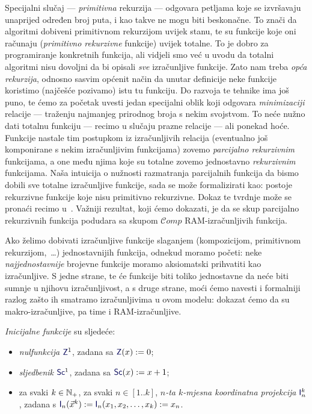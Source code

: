 Specijalni slučaj --- \emph{primitivna} rekurzija --- odgovara petljama koje se izvršavaju unaprijed određen broj puta, i kao takve ne mogu biti beskonačne. To znači da algoritmi dobiveni primitivnom rekurzijom uvijek stanu, te su funkcije koje oni računaju (\emph{primitivno rekurzivne} funkcije) uvijek totalne. To je dobro za programiranje konkretnih funkcija, ali vidjeli smo već u uvodu da totalni algoritmi nisu dovoljni da bi opisali \emph{sve} izračunljive funkcije. Zato nam treba \emph{opća rekurzija}, odnosno sasvim općenit način da unutar definicije neke funkcije koristimo (najčešće pozivamo) istu tu funkciju. Do razvoja te tehnike ima još puno, te ćemo za početak uvesti jedan specijalni oblik koji odgovara \emph{minimizaciji} relacije --- traženju najmanjeg prirodnog broja s nekim svojstvom. To neće nužno dati totalnu funkciju --- recimo u slučaju prazne relacije --- ali ponekad hoće. Funkcije nastale tim postupkom iz izračunljivih relacija (eventualno još komponirane s nekim izračunljivim funkcijama) zovemo \emph{parcijalno rekurzivnim} funkcijama, a one među njima koje su totalne zovemo jednostavno \emph{rekurzivnim} funkcijama. Naša intuicija o nužnosti razmatranja parcijalnih funkcija da bismo dobili sve totalne izračunljive funkcije, sada se može formalizirati kao: postoje rekurzivne funkcije koje nisu primitivno rekurzivne. Dokaz te tvrdnje može se pronaći recimo u~\cite[dodatak]{skr:Vuk}. Važniji rezultat, koji ćemo dokazati, je da se skup parcijalno rekurzivnih funkcija podudara sa skupom $\mathcal Comp$ RAM-izračunljivih funkcija. %


Ako želimo dobivati izračunljive funkcije slaganjem (kompozicijom, primitivnom rekurzijom,~\ldots) jednostavnijih funkcija, odnekud moramo početi: neke \emph{najjednostavnije} brojevne funkcije moramo aksiomatski prihvatiti kao izračunljive. S jedne strane, te će funkcije biti toliko jednostavne da neće biti sumnje u njihovu izračunljivost, a s druge strane, moći ćemo navesti i formalniji razlog zašto ih smatramo izračunljivima u ovom modelu: dokazat ćemo da su makro-izračunljive, pa time i RAM-izračunljive.

\begin{definicija}[{name=[inicijalne funkcije]}]\label{def:init}
\emph{Inicijalne funkcije} su sljedeće:
\begin{itemize}
    \item \emph{nulfunkcija} $\f Z^1$, zadana sa $\f Z(x):=0$;
    \item \emph{sljedbenik} $\f{Sc}^1$, zadana sa $\f{Sc}(x):=x+1$;
    \item za svaki $k\in{\mathbb N}_+$, za svaki $n\in[1..k]$, \emph{$n$-ta $k$-mjesna koordinatna projekcija} $\f I_n^k$, zadana s $\f I_n(\vec x^k):=\f I_n(x_1,x_2,\dotsc,x_k):=x_n$.\qedhere
\end{itemize}
\end{definicija}

